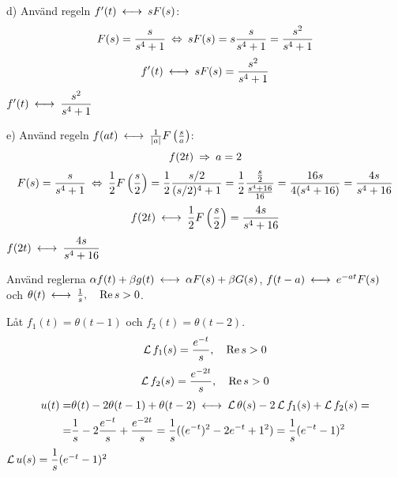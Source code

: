 \begin{task}{d)}
	Använd regeln $f'(t) \llra sF(s)$:
	\begin{align*}
	F(s)=
	\frac{s}{s^4+1} \lra 
	sF(s)=
	s\frac{s}{s^4+1}=
	\frac{s^2}{s^4+1}
	\end{align*}
	\[f'(t) \llra sF(s)=\frac{s^2}{s^4+1}\]
	\ans $f'(t) \llra \dfrac{s^2}{s^4+1}$
\end{task}

\begin{task}{e)}
	Använd regeln $f(at) \llra \frac{1}{\abs{a}}F\left(\frac{s}{a}\right)$:
	\[f(2t) \ra a=2\]
	\begin{align*}
	F(s)=
	\frac{s}{s^4+1} \lra 
	\frac{1}{2}F\left(\frac{s}{2}\right)=
	\frac{1}{2}\frac{s/2}{(s/2)^4+1}=
	\frac{1}{2}\frac{\frac{s}{2}}{\frac{s^4+16}{16}}=
	\frac{16s}{4(s^4+16)}=
	\frac{4s}{s^4+16}
	\end{align*}
	\[f(2t) \llra \frac{1}{2}F\left(\frac{s}{2}\right)=\frac{4s}{s^4+16}\]
	\ans $f(2t) \llra \dfrac{4s}{s^4+16}$
\end{task}

\begin{task}{3.5}
	Använd reglerna $\alpha f(t)+\beta g(t) \llra \alpha F(s)+\beta G(s)$, $f(t-a) \llra e^{-at}F(s)$ \\
	och $\theta(t)\llra \frac{1}{s}\cond{\Re s > 0}$.
	
	Låt $f_1(t)=\theta(t-1)$ och $f_2(t)=\theta(t-2)$.
	\[\operatorname{\mathcal{L}} f_1(s) = \frac{e^{-t}}{s}, \quad \operatorname{Re} s > 0\]
	\[\operatorname{\mathcal{L}} f_2(s) = \frac{e^{-2t}}{s}, \quad \operatorname{Re} s > 0\]
	\begin{align*}
	u(t)=
	&\theta(t)-2\theta(t-1)+\theta(t-2) \llra
	\laplace\theta(s)-2\laplace f_1(s)+\laplace f_2(s)= \\ =
	&\frac{1}{s}-2\frac{e^{-t}}{s}+\frac{e^{-2t}}{s}=
	\frac{1}{s}((e^{-t})^2-2e^{-t}+1^2)=
	\frac{1}{s}(e^{-t}-1)^2
	\end{align*}
	\ans $\operatorname{\mathcal{L}} u(s) = \dfrac{1}{s}(e^{-t}-1)^2$
\end{task}

